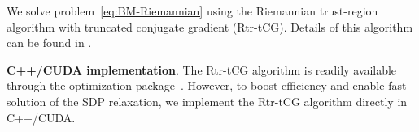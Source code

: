 We solve problem~\eqref{eq:BM-Riemannian} using the Riemannian trust-region algorithm with truncated conjugate gradient (Rtr-tCG). Details of this algorithm can be found in \cite{absil2008optimization, boumal2023introduction}. 




\textbf{C++/CUDA implementation}. The Rtr-tCG algorithm is readily available through the \manopt optimization package~\cite{boumal2014manopt}. However, to boost efficiency and enable fast solution of the SDP relaxation, we implement the Rtr-tCG algorithm directly in C++/CUDA. 


